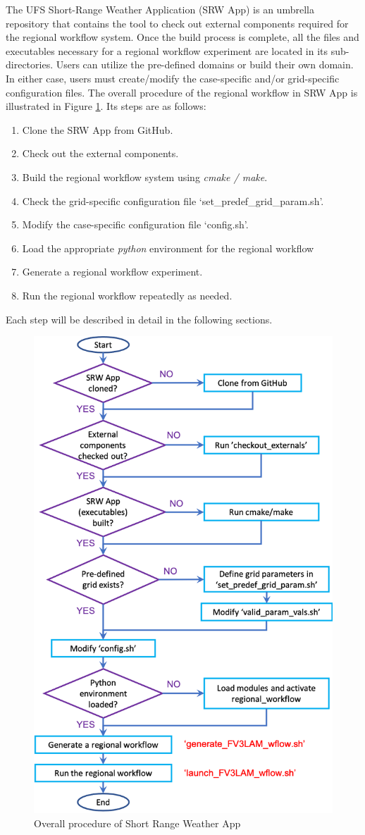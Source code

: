 \documentclass[11pt,fleqn]{report}              %
\begin{document}
The UFS Short-Range Weather Application (SRW App) is an umbrella repository that contains the tool to check out external components required for the regional workflow system. Once the build process is complete, all the files and executables necessary for a regional workflow experiment are located in its sub-directories. Users can utilize the pre-defined domains or build their own domain. In either case, users must create/modify the case-specific and/or grid-specific configuration files. The overall procedure of the regional workflow in SRW App is illustrated in Figure \ref{fig:srw_overall}. Its steps are as follows:

\begin{enumerate}
\item Clone the SRW App from GitHub.
\item Check out the external components.
\item Build the regional workflow system using {\it cmake / make}.
\item Check the grid-specific configuration file `set\_predef\_grid\_param.sh'.
\item Modify the case-specific configuration file `config.sh'.
\item Load the appropriate {\it python} environment for the regional workflow
\item Generate a regional workflow experiment.
\item Run the regional workflow repeatedly as needed.
\end{enumerate}

Each step will be described in detail in the following sections.

\vspace{0.3cm}

\begin{figure}[H]
  \centering
  \includegraphics[width=0.6\linewidth]{FV3LAM_wflow_overall.png}
  \caption{Overall procedure of Short Range Weather App}
  \label{fig:srw_overall}
\end{figure}
\end{document}
